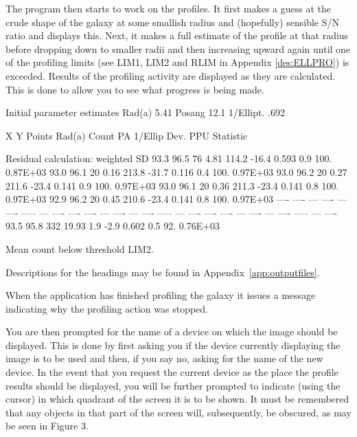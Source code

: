 \documentclass[twoside,11pt]{starlink}
\begin{document}
The program then starts to work on the profiles. It first makes a guess at
the crude shape of the galaxy at some smallish radius and (hopefully)
sensible S/N ratio and displays this.
Next, it makes a full estimate of the profile at that radius before dropping
down to smaller radii and then increasing upward again until
one of the profiling limits (see LIM1, LIM2 and RLIM in Appendix
\ref{des:ELLPRO})
is exceeded. Results of the
profiling activity are displayed as they are calculated. This is done to allow
you to see what progress is being made.

\begin{small}
\begin{terminalv}
Initial parameter estimates
Rad(a)     5.41  Posang   12.1  1/Ellipt.  .692

  X       Y     Points   Rad(a)    Count     PA  1/Ellip Dev.  PPU  Statistic

Residual calculation: weighted SD
  93.3    96.5    76      4.81      114.2  -16.4  0.593    0.9  100.  0.87E+03
  93.0    96.1    20      0.16      213.8  -31.7  0.116    0.4  100.  0.97E+03
  93.0    96.2    20      0.27      211.6  -23.4  0.141    0.9  100.  0.97E+03
  93.0    96.1    20      0.36      211.3  -23.4  0.141    0.8  100.  0.97E+03
  92.9    96.2    20      0.45      210.6  -23.4  0.141    0.8  100.  0.97E+03
  ----    ----    ---     ----       ---    ----  -----    ---  ----
  ----    ----    ---     ----       ---    ----  -----    ---  ----
  ----    ----    ---     ----       ---    ----  -----    ---  ----
  93.5    95.8   332     19.93        1.9   -2.9  0.602    0.5   92.  0.76E+03

Mean count below threshold LIM2.
\end{terminalv}
\end{small}

Descriptions for the headings may be found in Appendix~\ref{app:outputfiles}.

When the application has finished profiling the galaxy it issues a message
indicating why the profiling action was stopped.

You are then prompted for the name of a device on which the image should be
displayed. This is done by first asking you if the device currently displaying
the image is to be used
and then, if you say no, asking for the name of the new device. In the event
that you request the current device as the place the profile results should be
displayed, you will be further prompted to indicate (using the cursor) in which
quadrant of the
screen it is to be shown. It must be remembered that any objects in that part
of the screen will, subsequently, be obscured, as may be seen in Figure 3.
\end{document}
